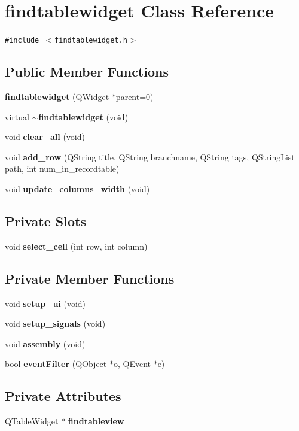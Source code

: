 \section{findtablewidget Class Reference}
\label{classfindtablewidget}
{\tt \#include $<$findtablewidget.h$>$}

\subsection*{Public Member Functions}
\begin{CompactItemize}
\item 
{\bf findtablewidget} (QWidget $\ast$parent=0)
\item 
virtual {\bf $\sim$findtablewidget} (void)
\item 
void {\bf clear\_\-all} (void)
\item 
void {\bf add\_\-row} (QString title, QString branchname, QString tags, QString\-List path, int num\_\-in\_\-recordtable)
\item 
void {\bf update\_\-columns\_\-width} (void)
\end{CompactItemize}
\subsection*{Private Slots}
\begin{CompactItemize}
\item 
void {\bf select\_\-cell} (int row, int column)
\end{CompactItemize}
\subsection*{Private Member Functions}
\begin{CompactItemize}
\item 
void {\bf setup\_\-ui} (void)
\item 
void {\bf setup\_\-signals} (void)
\item 
void {\bf assembly} (void)
\item 
bool {\bf event\-Filter} (QObject $\ast$o, QEvent $\ast$e)
\end{CompactItemize}
\subsection*{Private Attributes}
\begin{CompactItemize}
\item 
QTable\-Widget $\ast$ {\bf findtableview}
\end{CompactItemize}


